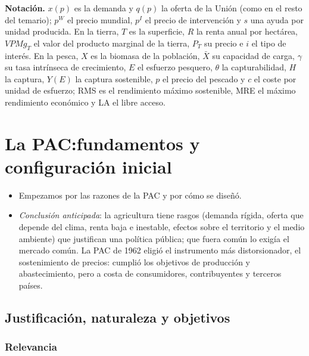 \documentclass[11pt]{article}
\begin{document}
\begin{anotaciones}
\textbf{Notación.} $x(p)$ es la demanda y $q(p)$ la oferta de la Unión (como en el resto del temario); $p^W$ el precio mundial, $p^I$ el precio de intervención y $s$ una ayuda por unidad producida. En la tierra, $T$ es la superficie, $R$ la renta anual por hectárea, $\mathit{VPMg}_T$ el valor del producto marginal de la tierra, $P_T$ su precio e $i$ el tipo de interés. En la pesca, $X$ es la biomasa de la población, $\bar X$ su capacidad de carga, $\gamma$ su tasa intrínseca de crecimiento, $E$ el esfuerzo pesquero, $\theta$ la capturabilidad, $H$ la captura, $Y(E)$ la captura sostenible, $p$ el precio del pescado y $c$ el coste por unidad de esfuerzo; RMS es el rendimiento máximo sostenible, MRE el máximo rendimiento económico y LA el libre acceso.
\end{anotaciones}

\section{La PAC:\cortetitulo fundamentos y configuración inicial}\label{sec:fundamentos}

\begin{itemize}
\item Empezamos por las razones de la PAC y por cómo se diseñó.
\item \emph{Conclusión anticipada}: la agricultura tiene rasgos (demanda rígida, oferta que depende del clima, renta baja e inestable, efectos sobre el territorio y el medio ambiente) que justifican una política pública; que fuera común lo exigía el mercado común. La PAC de 1962 eligió el instrumento más distorsionador, el sostenimiento de precios: cumplió los objetivos de producción y abastecimiento, pero a costa de consumidores, contribuyentes y terceros países.
\end{itemize}

\subsection{Justificación, naturaleza y objetivos}\label{sec:justificacion-pac}

\subsubsection{Relevancia}\label{sec:relevancia-pac}
\end{document}
